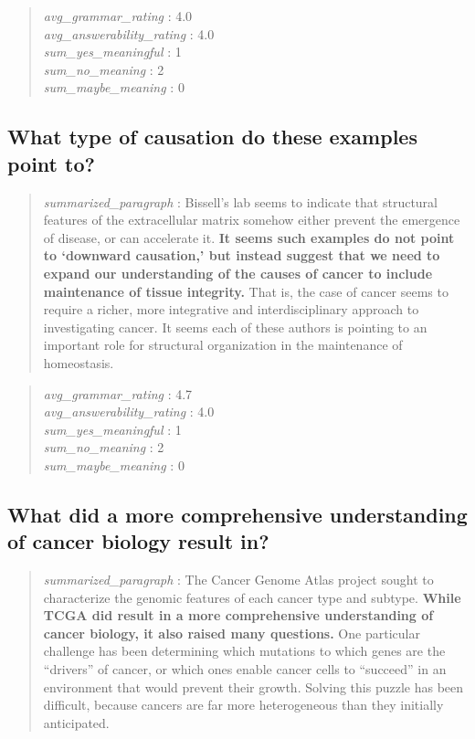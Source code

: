 \begin{quote}
\emph{avg\_grammar\_rating} : 4.0\\
\emph{avg\_answerability\_rating} : 4.0\\
\emph{sum\_yes\_meaningful} : 1\\
\emph{sum\_no\_meaning} : 2\\
\emph{sum\_maybe\_meaning} : 0
\end{quote}

\hypertarget{what-type-of-causation-do-these-examples-point-to}{%
\subsection{What type of causation do these examples point
to?}\label{what-type-of-causation-do-these-examples-point-to}}

\begin{quote}
\emph{summarized\_paragraph} : Bissell's lab seems to indicate that
structural features of the extracellular matrix somehow either prevent
the emergence of disease, or can accelerate it. \textbf{It seems such
examples do not point to `downward causation,' but instead suggest that
we need to expand our understanding of the causes of cancer to include
maintenance of tissue integrity.} That is, the case of cancer seems to
require a richer, more integrative and interdisciplinary approach to
investigating cancer. It seems each of these authors is pointing to an
important role for structural organization in the maintenance of
homeostasis.
\end{quote}

\begin{quote}
\emph{avg\_grammar\_rating} : 4.7\\
\emph{avg\_answerability\_rating} : 4.0\\
\emph{sum\_yes\_meaningful} : 1\\
\emph{sum\_no\_meaning} : 2\\
\emph{sum\_maybe\_meaning} : 0
\end{quote}

\hypertarget{what-did-a-more-comprehensive-understanding-of-cancer-biology-result-in}{%
\subsection{What did a more comprehensive understanding of cancer
biology result
in?}\label{what-did-a-more-comprehensive-understanding-of-cancer-biology-result-in}}

\begin{quote}
\emph{summarized\_paragraph} : The Cancer Genome Atlas project sought to
characterize the genomic features of each cancer type and subtype.
\textbf{While TCGA did result in a more comprehensive understanding of
cancer biology, it also raised many questions.} One particular challenge
has been determining which mutations to which genes are the ``drivers''
of cancer, or which ones enable cancer cells to ``succeed'' in an
environment that would prevent their growth. Solving this puzzle has
been difficult, because cancers are far more heterogeneous than they
initially anticipated.
\end{quote}

